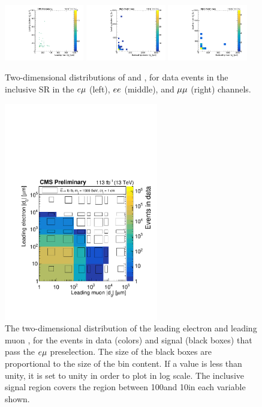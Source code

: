 \begin{figure}[hbtp]
\centering
\includegraphics[width=0.31\textwidth]{figures/results/electronAbsD0[0]_vs_muonAbsD0[0]_1000um.pdf}
\includegraphics[width=0.31\textwidth]{figures/results/electronAbsD0[0]_vs_electronAbsD0[1]_10000um.pdf}
\includegraphics[width=0.31\textwidth]{figures/results/muonAbsD0[0]_vs_muonAbsD0[1]_10000um.pdf}
\caption{
Two-dimensional distributions of \ada and \adb, for data events in the inclusive SR in the $e{\mu}$ (left), $ee$ (middle), and ${\mu}{\mu}$ (right) channels.
}
\label{d0_d0_sr_data}
\end{figure}

\begin{figure}[hbtp]
\centering
\includegraphics[width=0.6\textwidth]{figures/results/d0vsd0_emu_withSignal_CMSPreliminary.pdf}
\caption{
The two-dimensional distribution of the leading electron and leading muon \ad, for the events in data (colors) and signal (black boxes) that pass the $e{\mu}$ preselection. The size of the black boxes are proportional to the size of the bin content. If a \ad value is less than unity, it is set to unity in order to plot in log scale. The inclusive signal region covers the region between 100\mum and 10\cm in each \ad variable shown.
}
\label{d0_d0_sr_data_and_signal}
\end{figure}